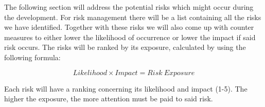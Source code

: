 The following section will address the potential risks which might occur during the development.
For risk management there will be a list containing all the risks we have identified.
Together with these risks we will also come up with counter measures to either lower the likelihood of occurrence or
lower the impact if said risk occurs.
The risks will be ranked by its exposure, calculated by using the following formula:

\begin{equation}
    Likelihood \times Impact=Risk\ Exposure\label{eq:risk_exposure}
\end{equation}

Each risk will have a ranking concerning its likelihood and impact (1-5).
The higher the exposure, the more attention must be paid to said risk.

